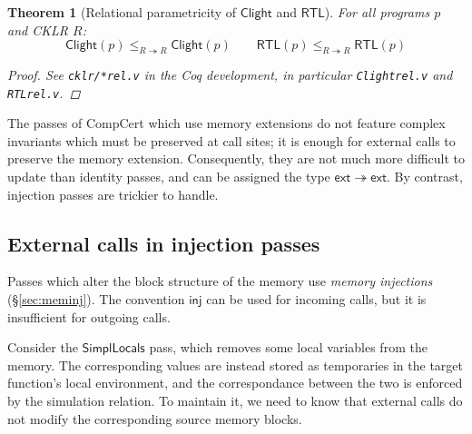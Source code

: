 \documentclass[draft,11pt]{report}
\newtheorem{theorem}{Theorem}
\newcommand{\kw}[1]{\ensuremath{ \mathsf{#1} }}
\begin{document}
\begin{theorem}[Relational parametricity of $\kw{Clight}$ and $\kw{RTL}$] %
\label{thm:param}
For all programs $p$ and CKLR $R$:
\[
      \kw{Clight}(p)
        \le_{R \twoheadrightarrow R}
      \kw{Clight}(p)
      \qquad
      \kw{RTL}(p)
        \le_{R \twoheadrightarrow R}
      \kw{RTL}(p)
\]
\begin{proof}
See \texttt{cklr/*rel.v} in the Coq development,
in particular \texttt{Clightrel.v} and \texttt{RTLrel.v}.
\end{proof}
\end{theorem}

The passes of CompCert which use memory extensions
do not feature complex invariants
which must be preserved at call sites;
it is enough for external calls to preserve
the memory extension.
Consequently,
they are not much more difficult to update
than identity passes,
and can be assigned the type $\kw{ext} \twoheadrightarrow \kw{ext}$.
By contrast,
injection passes are trickier to handle.


\subsection{External calls in injection passes} \label{sec:injp} %

Passes which alter the block structure of the memory
use \emph{memory injections} (\S\ref{sec:meminj}).
The convention \kw{inj} can be used for incoming calls,
but it is insufficient for outgoing calls.

Consider the \kw{SimplLocals} pass,
which removes some local variables %
from the memory.
The corresponding values are instead stored
as temporaries in the target function's local environment,
and the correspondance between the two
is enforced by the simulation relation.
To maintain it,
we need to know that
external calls do not modify
the corresponding source memory blocks.
\end{document}

